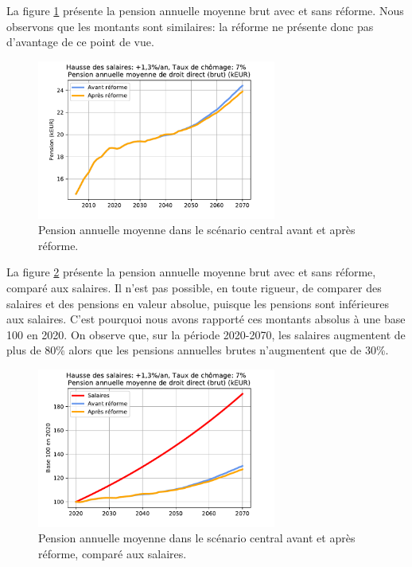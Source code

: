 \documentclass[10pt]{article}
\begin{document}
La figure \ref{fig-pension-annuelle-simulation-vs-COR} présente la pension 
annuelle moyenne brut avec et sans réforme. 
Nous observons que les montants sont similaires: la réforme ne présente donc pas 
d'avantage de ce point de vue. 

\begin{figure}
\begin{center}
\includegraphics[width=0.7\textwidth]{Simulation-pension-annuelle-moyenne-3.pdf}
\end{center}
\caption{Pension annuelle moyenne dans le scénario central 
avant et après réforme.}
\label{fig-pension-annuelle-simulation-vs-COR}
\end{figure}

La figure \ref{fig-pension-annuelle-avant-apres-salaires} présente la pension 
annuelle moyenne brut avec et sans réforme, comparé aux salaires. 
Il n'est pas possible, en toute rigueur, de comparer des salaires et 
des pensions en valeur absolue, puisque les pensions sont inférieures aux 
salaires. 
C'est pourquoi nous avons rapporté ces montants absolus à une base 100 en 2020.  
On observe que, sur la période 2020-2070, les salaires augmentent de plus de 80\% 
alors que les pensions annuelles brutes n'augmentent que de 30\%. 

\begin{figure}
\begin{center}
\includegraphics[width=0.7\textwidth]{Simulation-pension-vs-salaires-3.pdf}
\end{center}
\caption{Pension annuelle moyenne dans le scénario central 
avant et après réforme, comparé aux salaires.}
\label{fig-pension-annuelle-avant-apres-salaires}
\end{figure}
\end{document}

